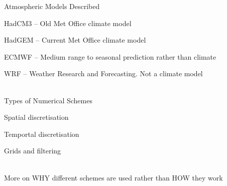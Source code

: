 \begin{slide}{}

{\large\color{purple} Atmospheric Models Described}
\begin{list0}
\item HadCM3 -- Old Met Office climate model
\item HadGEM -- Current Met Office climate model
\item ECMWF -- Medium range to seasonal prediction rather than climate
\item WRF -- Weather Research and Forecasting. Not a climate model
\end{list0}

\ \\

{\large\color{purple} Types of Numerical Schemes}
\begin{list0}
\item Spatial discretisation
\item Temportal discretisation
\item Grids and filtering
\end{list0}

\ \\
{\large\color{purple} More on WHY different schemes are used rather than HOW they work}

\end{slide}

